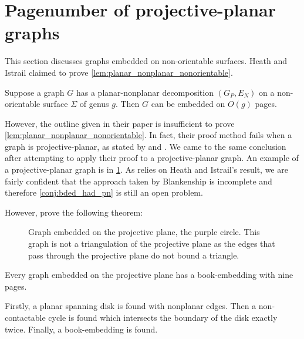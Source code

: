 
\section{Pagenumber of projective-planar graphs}
This section discusses graphs embedded on non-orientable surfaces. Heath and Istrail claimed to prove \cref{lem:planar_nonplanar_nonorientable}.
\begin{conjecture}\label{lem:planar_nonplanar_nonorientable}
	Suppose a graph \(G\) has a planar-nonplanar decomposition \((G_P, E_N)\) on a non-orientable surface \(\Sigma\) of genus $g$. Then \(G\) can be embedded on \( O(g)\) pages.
\end{conjecture}
However, the outline given in their paper is insufficient to prove \cref{lem:planar_nonplanar_nonorientable}. In fact, their proof method fails when a graph is projective-planar, as stated by \textcite{nakamotoBookEmbeddingProjectiveplanar2015} and \textcite{ozekiBookEmbeddingGraphs2019}. We came to the same conclusion after attempting to apply their proof to a projective-planar graph. An example of a projective-planar graph is in \cref{fig:projectiveplanar}.
As \textcite{Blankenship-PhD03} relies on Heath and Istrail's result, we are fairly confident that the approach taken by Blankenship is incomplete and therefore \cref{conj:bded_had_pn} is still an open problem. 

However, \textcite{nakamotoBookEmbeddingProjectiveplanar2015} prove the following theorem:

\begin{figure}[h]
    \centering
    
    \caption[Projective planar graph]{Graph embedded on the projective plane, the purple circle. This graph is not a triangulation of the projective plane as the edges that pass through the projective plane do not bound a triangle.}\label{fig:projectiveplanar}\end{figure}

\begin{theorem}\label{thm:proj_planar_graphs_9pages}
	Every graph embedded on the projective plane has a book-embedding with nine pages.
\end{theorem}
Firstly, a planar spanning disk is found with nonplanar edges. Then a non-contactable cycle is found which intersects the boundary of the disk exactly twice. Finally, a book-embedding is found.

